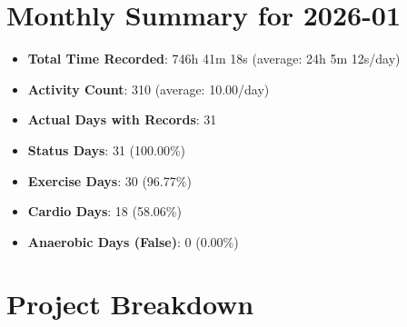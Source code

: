 \documentclass[12pt]{extarticle}
\begin{document}
{\fontsize{18}{21.6}\selectfont\section*{Monthly Summary for 2026-01}}

\begin{itemize}[topsep=0pt, itemsep=-0.5ex]
    \item \textbf{Total Time Recorded}: 746h 41m 18s (average: 24h 5m 12s/day)
    \item \textbf{Activity Count}: 310 (average: 10.00/day)
    \item \textbf{Actual Days with Records}: 31
    \item \textbf{Status Days}: 31 (100.00\%)
    \item \textbf{Exercise Days}: 30 (96.77\%)
    \item \textbf{Cardio Days}: 18 (58.06\%)
    \item \textbf{Anaerobic Days (False)}: 0 (0.00\%)
\end{itemize}

{\fontsize{16}{19.2}\selectfont\section*{Project Breakdown}}
\end{document}
